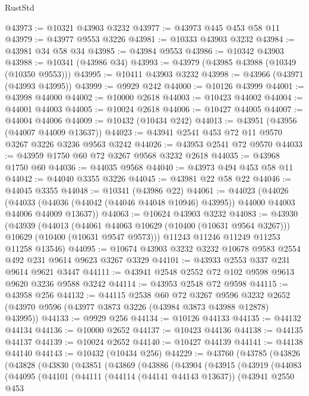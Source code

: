 \begin{lexlean}{RustStd}
\begin{coremodule}
@43973 := @10321 @43903 @3232
@43977 := @43973 @445 @453 @58 @11
@43979 := @43977 @9553 @3226
@43981 := @10333 @43903 @3232
@43984 := @43981 @34 @58 @34
@43985 := @43984 @9553
@43986 := @10342 @43903
@43988 := @10341 (@43986 @34)
@43993 := @43979 (@43985 @43988 (@10349 (@10350 @9553)))
@43995 := @10411 @43903 @3232
@43998 := @43966 (@43971 (@43993 @43995))
@43999 := @9929 @242
@44000 := @10126 @43999
@44001 := @43998 @44000
@44002 := @10000 @2618
@44003 := @10423 @44002
@44004 := @44001 @44003
@44005 := @10024 @2618
@44006 := @10427 @44005
@44007 := @44004 @44006
@44009 := @10432 (@10434 @242)
@44013 := @43951 (@43956 (@44007 @44009 @13637))
@44023 := @43941 @2541 @453 @72 @11 @9570 @3267 @3226 @3236 @9563 @3242
@44026 := @43953 @2541 @72 @9570
@44033 := @43959 @1750 @60 @72 @3267 @9568 @3232 @2618
@44035 := @43968 @1750 @60
@44036 := @44035 @9568
@44040 := @43973 @494 @453 @58 @11
@44042 := @44040 @3355 @3226
@44045 := @43981 @22 @58 @22
@44046 := @44045 @3355
@44048 := @10341 (@43986 @22)
@44061 := @44023
    (@44026
      (@44033 (@44036 (@44042 (@44046 @44048 @10946) @43995)) @44000 @44003 @44006 @44009 @13637))
@44063 := @10624 @43903 @3232
@44083 := @43930
    (@43939
      (@44013
        (@44061 @44063 @10629 (@10400 (@10631 @9564 @3267)))
        @10629
        (@10400 (@10631 @9547 @9573)))
      @11243
      @11246
      @11249
      @11253
      @11258
      @13546)
@44095 := @10674 @43903 @3232 @3232 @10678 @9583 @2554 @492 @231 @9614 @9623 @3267 @3329
@44101 := @43933 @2553 @337 @231 @9614 @9621 @3447
@44111 := @43941 @2548 @2552 @72 @102 @9598 @9613 @9620 @3236 @9588 @3242
@44114 := @43953 @2548 @72 @9598
@44115 := @43958 @256
@44132 := @44115
    @2538
    @60
    @72
    @3267
    @9596
    @3232
    @2652
    (@43970 @9596 (@43977 @3873 @3226 (@43984 @3873 @43988 @12878) @43995))
@44133 := @9929 @256
@44134 := @10126 @44133
@44135 := @44132 @44134
@44136 := @10000 @2652
@44137 := @10423 @44136
@44138 := @44135 @44137
@44139 := @10024 @2652
@44140 := @10427 @44139
@44141 := @44138 @44140
@44143 := @10432 (@10434 @256)
@44229 := @43760
    (@43785
      (@43826
        (@43828
          (@43830
            (@43851
              (@43869
                (@43886
                  (@43904
                    (@43915
                      (@43919
                        (@44083
                          (@44095
                            (@44101
                              (@44111
                                (@44114 (@44141 @44143 @13637))
                                (@43941
                                  @2550
                                  @453

\end{coremodule}
\end{lexlean}
